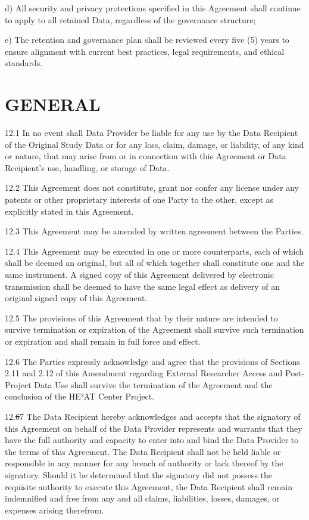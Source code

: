 \documentclass[12pt,letterpaper]{article}
\newcommand{\deleted}[1]{\textcolor{deletecolor}{\sout{#1}}}
\newcommand{\added}[1]{\textcolor{addcolor}{#1}}
\begin{document}
\added{d) All security and privacy protections specified in this Agreement shall continue to apply to all retained Data, regardless of the governance structure;}

\added{e) The retention and governance plan shall be reviewed every five (5) years to ensure alignment with current best practices, legal requirements, and ethical standards.}

\section{GENERAL}

12.1 In no event shall Data Provider be liable for any use by the Data Recipient of the Original Study Data or for any loss, claim, damage, or liability, of any kind or nature, that may arise from or in connection with this Agreement or Data Recipient's use, handling, or storage of Data.

12.2 This Agreement does not constitute, grant nor confer any license under any patents or other proprietary interests of one Party to the other, except as explicitly stated in this Agreement.

12.3 This Agreement may be amended by written agreement between the Parties.

12.4 This Agreement may be executed in one or more counterparts, each of which shall be deemed an original, but all of which together shall constitute one and the same instrument. A signed copy of this Agreement delivered by electronic transmission shall be deemed to have the same legal effect as delivery of an original signed copy of this Agreement.

12.5 The provisions of this Agreement that by their nature are intended to survive termination or expiration of the Agreement shall survive such termination or expiration and shall remain in full force and effect.

\added{12.6 The Parties expressly acknowledge and agree that the provisions of Sections 2.11 and 2.12 of this Amendment regarding External Researcher Access and Post-Project Data Use shall survive the termination of the Agreement and the conclusion of the HE²AT Center Project.}

12.\deleted{6}\added{7} The Data Recipient hereby acknowledges and accepts that the signatory of this Agreement on behalf of the Data Provider represents and warrants that they have the full authority and capacity to enter into and bind the Data Provider to the terms of this Agreement. The Data Recipient shall not be held liable or responsible in any manner for any breach of authority or lack thereof by the signatory. Should it be determined that the signatory did not possess the requisite authority to execute this Agreement, the Data Recipient shall remain indemnified and free from any and all claims, liabilities, losses, damages, or expenses arising therefrom.
\end{document}
